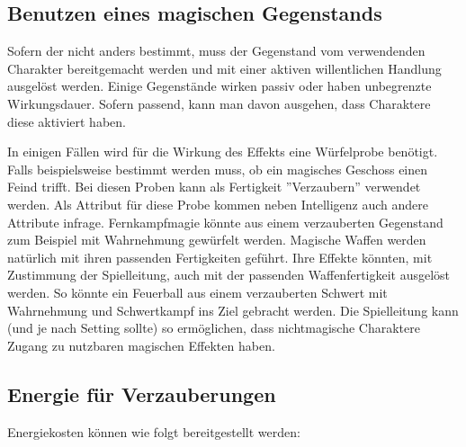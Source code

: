 \documentclass{article}
\begin{document}
\begin{center}
\subsection{Benutzen eines magischen Gegenstands}
\end{center}

Sofern der nicht anders bestimmt, muss der Gegenstand vom verwendenden Charakter bereitgemacht werden und mit einer
aktiven willentlichen Handlung ausgelöst werden. Einige Gegenstände wirken passiv oder haben unbegrenzte Wirkungsdauer.
Sofern passend, kann man davon ausgehen, dass Charaktere diese aktiviert haben.

In einigen Fällen wird für die Wirkung des Effekts eine Würfelprobe benötigt. Falls beispielsweise bestimmt werden muss,
ob ein magisches Geschoss einen Feind trifft. Bei diesen Proben kann als Fertigkeit ''Verzaubern'' verwendet werden. Als
Attribut für diese Probe kommen neben Intelligenz auch andere Attribute infrage. Fernkampfmagie könnte aus einem
verzauberten Gegenstand zum Beispiel mit Wahrnehmung gewürfelt werden.
Magische Waffen werden natürlich mit ihren passenden Fertigkeiten geführt. Ihre Effekte könnten, mit Zustimmung der
Spielleitung, auch mit der passenden Waffenfertigkeit ausgelöst werden. So könnte ein Feuerball aus einem verzauberten
Schwert mit Wahrnehmung und Schwertkampf ins Ziel gebracht werden. Die Spielleitung kann (und je nach Setting sollte) so
ermöglichen, dass nichtmagische Charaktere Zugang zu nutzbaren magischen Effekten haben.

\begin{center}
\subsection{Energie für Verzauberungen}
\end{center}

Energiekosten können wie folgt bereitgestellt werden:
\end{document}
